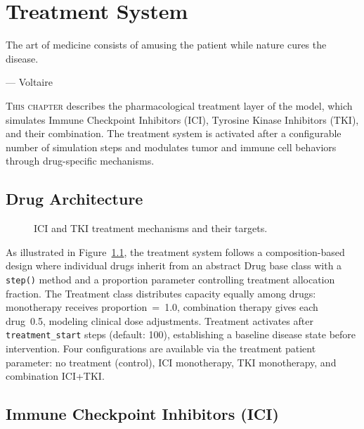 \chapter{Treatment System}
\label{ch:treatment}

\epigraph{The art of medicine consists of amusing the patient while nature cures the disease.}{--- Voltaire}

\lettrine[lines=2]{T}{his chapter} describes the pharmacological treatment layer of the model, which simulates Immune Checkpoint Inhibitors (ICI), Tyrosine Kinase Inhibitors (TKI), and their combination. The treatment system is activated after a configurable number of simulation steps and modulates tumor and immune cell behaviors through drug-specific mechanisms.

\section{Drug Architecture}
\label{sec:drug-architecture}

\begin{figure}[htbp]
\centering
{}
\caption{ICI and TKI treatment mechanisms and their targets.}
\label{fig:treatment_mechanisms}
\end{figure}

As illustrated in Figure~\ref{fig:treatment_mechanisms}, the treatment system follows a composition-based design where individual drugs inherit from an abstract Drug base class with a \texttt{step()} method and a proportion parameter controlling treatment allocation fraction. The Treatment class distributes capacity equally among drugs: monotherapy receives proportion~=~1.0, combination therapy gives each drug~0.5, modeling clinical dose adjustments. Treatment activates after \texttt{treatment\_start} steps (default: 100), establishing a baseline disease state before intervention. Four configurations are available via the treatment patient parameter: no treatment (control), ICI monotherapy, TKI monotherapy, and combination ICI+TKI.

\section{Immune Checkpoint Inhibitors (ICI)}
\label{sec:ici}

